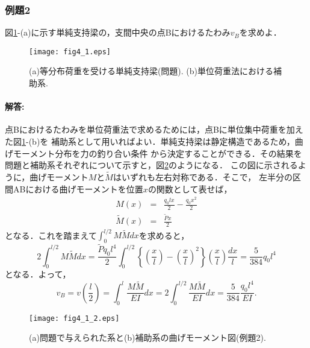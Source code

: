\documentclass[10pt,a4j]{jarticle}
\begin{document}
\subsubsection{例題2}
	図\ref{fig:fig2_5}-(a)に示す単純支持梁の，支間中央の点Bにおけるたわみ$v_B$を求めよ．
	\begin{figure}[h]
		\begin{center}
		\texttt{[image: fig4\_1.eps]} 
		\end{center}
		\caption{(a)等分布荷重を受ける単純支持梁(問題).
		 (b)単位荷重法における補助系.} 
		\label{fig:fig2_5}
	\end{figure}
\paragraph{解答:}
	点Bにおけるたわみを単位荷重法で求めるためには，点Bに単位集中荷重を加えた図\ref{fig:fig2_5}-(b)を
	補助系として用いればよい．単純支持梁は静定構造であるため，曲げモーメント分布を力の釣り合い条件
	から決定することができる．その結果を問題と補助系それぞれについて示すと，図\ref{fig:fig2_6}のようになる．
	この図に示されるように，曲げモーメント$M$と$\tilde M$はいずれも左右対称である．そこで，
	左半分の区間ABにおける曲げモーメントを位置$x$の関数として表せば，
	\begin{eqnarray}
		M(x) &=& \frac{q_0lx}{2}-\frac{q_0x^2}{2} \\
		\tilde M(x) &=& \frac{\tilde P x}{2}
		\label{eqn:}
	\end{eqnarray}
	となる．これを踏まえて$\int_0^{l/2} M\tilde Mdx$を求めると，
	\begin{equation}
		2\int_0^{l/2} M\tilde Mdx
		=\frac{\tilde Pq_0l^4}{2}
		\int_0^{l/2} 
		\left\{
			\left(\frac{x}{l}\right)- \left(\frac{x}{l} \right)^2
		\right\}
			\left(\frac{x}{l}\right)
		\frac{dx}{l}
		=\frac{5}{384}q_0l^4
		\label{eqn:}
	\end{equation}
	となる．よって，
	\begin{equation}
		v_B=
		v\left(\frac{l}{2}\right)=
		\int_0^l \frac{M\tilde M}{EI}dx=
		2\int_0^{l/2} \frac{M\tilde M}{EI}dx
		=\frac{5}{384}\frac{q_0l^4}{EI}
		.
		\label{eqn:}
	\end{equation}
\begin{figure}[h]
	\begin{center}
	\texttt{[image: fig4\_1\_2.eps]} 
	\end{center}
	\caption{(a)問題で与えられた系と(b)補助系の曲げモーメント図(例題2).}
	\label{fig:fig2_6}
\end{figure}
\end{document}
